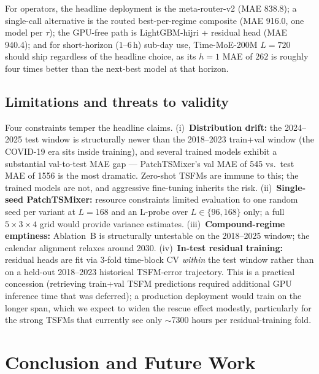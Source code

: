 \documentclass[10pt, a4paper, twocolumn]{article}
\begin{document}
For operators, the headline deployment is the meta-router-v2 (MAE
\num{838.8}); a single-call alternative is the routed
best-per-regime composite (MAE \num{916.0}, one model per $\tau$);
the GPU-free path is LightGBM-hijri + residual head (MAE
\num{940.4}); and for short-horizon ($1$--$6\,$h) sub-day use,
Time-MoE-200M $L = 720$ should ship regardless of the headline
choice, as its $h = 1$ MAE of $262$ is roughly four times better
than the next-best model at that horizon.

\subsection{Limitations and threats to validity}

Four constraints temper the headline claims. (i)~\textbf{Distribution
drift:} the 2024--2025 test window is structurally newer than the
2018--2023 train+val window (the COVID-19 era sits inside training),
and several trained models exhibit a substantial val-to-test MAE
gap --- PatchTSMixer's val MAE of \num{545} vs.\ test MAE of
\num{1556} is the most dramatic. Zero-shot TSFMs are immune to
this; the trained models are not, and aggressive fine-tuning
inherits the risk. (ii)~\textbf{Single-seed PatchTSMixer:} resource
constraints limited evaluation to one random seed per variant at
$L = 168$ and an L-probe over $L \in \{96, 168\}$ only; a full
$5 \times 3 \times 4$ grid would provide variance estimates.
(iii)~\textbf{Compound-regime emptiness:} Ablation~B is
structurally untestable on the 2018--2025 window; the calendar
alignment relaxes around 2030. (iv)~\textbf{In-test residual
training:} residual heads are fit via 3-fold time-block CV
\emph{within} the test window rather than on a held-out 2018--2023
historical TSFM-error trajectory. This is a practical concession
(retrieving train+val TSFM predictions required additional GPU
inference time that was deferred); a production deployment would
train on the longer span, which we expect to widen the rescue
effect modestly, particularly for the strong TSFMs that currently
see only $\sim$\num{7300} hours per residual-training fold.

\section{Conclusion and Future Work}
\label{sec:conclusion}
\end{document}
